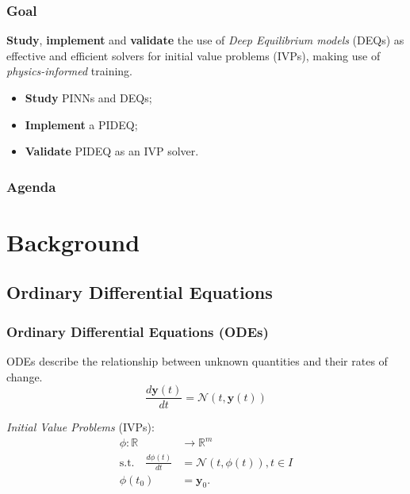 \documentclass[t]{beamer}
\newcommand{\R}{\mathbb{R}}
\begin{document}

\begin{frame}
\frametitle{Goal}
\textbf{Study}, \textbf{implement} and \textbf{validate} the use of \emph{Deep Equilibrium models} (DEQs) as effective and efficient solvers for initial value problems (IVPs), making use of \emph{physics-informed} training.

\begin{itemize}
    \item<2-> \textbf{Study} PINNs and DEQs;
    \item<3-> \textbf{Implement} a PIDEQ;
    \item<4-> \textbf{Validate} PIDEQ as an IVP solver.
\end{itemize}
\end{frame}


\begin{frame}
\frametitle{Agenda}
\tableofcontents
\end{frame}

\section{Background}

\subsection{Ordinary Differential Equations}

\begin{frame}
    \frametitle{Ordinary Differential Equations (ODEs)}
    ODEs describe the relationship between unknown quantities and their rates of change.
    \begin{equation}
    \frac{d \bm{y}\left( t \right) }{d t} = \mathcal{N}\left( t, \bm{y}\left( t \right)  \right) 
    \end{equation}\pause

    \emph{Initial Value Problems} (IVPs):
    \begin{align*}
	\phi :\R&\to \R^{m} \\
	\text{s.t.} \quad \frac{d \phi\left( t \right) }{d t} &= \mathcal{N}\left( t, \phi\left( t \right)  \right), t\in I \\
		    \phi(t_0) &= \bm{y}_0
    .\end{align*}
\end{frame}
\end{document}
